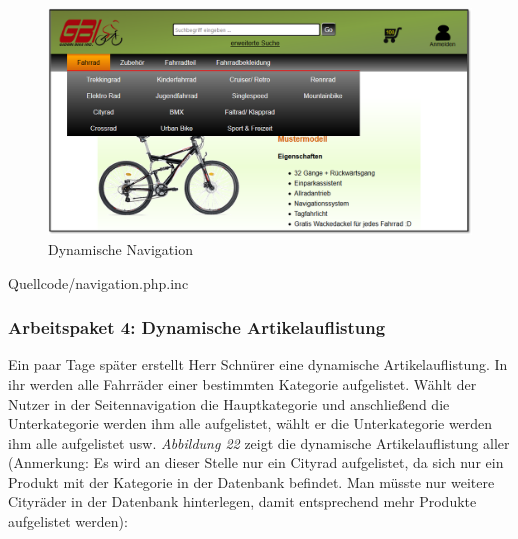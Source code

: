\begin{figure}[H]
\begin{center}
\includegraphics[width=150mm]{Bilder/Abbildung9-DynamischeNaviagtionDesWebshops.png}
\end{center}
\caption{Dynamische Navigation}
\label{Abbildung9-Dynamische Navigation}
\end{figure}

\newpage
\begin{center}
	\begin{lstinputlisting}[language=PHP, caption={Auszug aus der Klasse Navigation - Die dynamische Seitennavigation}]
		{Quellcode/navigation.php.inc}
	\end{lstinputlisting}
\end{center}


\subsubsection{Arbeitspaket 4: Dynamische Artikelauflistung}

Ein paar Tage später erstellt Herr Schnürer eine dynamische Artikelauflistung. In ihr werden alle Fahrräder einer bestimmten Kategorie aufgelistet. Wählt der Nutzer in der Seitennavigation die Hauptkategorie \grqq{} und anschließend die Unterkategorie \grqq{} werden ihm alle \grqq{} aufgelistet, wählt er die Unterkategorie \grqq{} werden ihm alle \grqq{} aufgelistet usw. \textit{Abbildung 22} zeigt die dynamische Artikelauflistung aller \grqq{} (Anmerkung: Es wird an dieser Stelle nur ein Cityrad aufgelistet, da sich nur ein Produkt mit der Kategorie \grqq{} in der Datenbank befindet. Man müsste nur weitere Cityräder in der Datenbank hinterlegen, damit entsprechend mehr Produkte aufgelistet werden):

